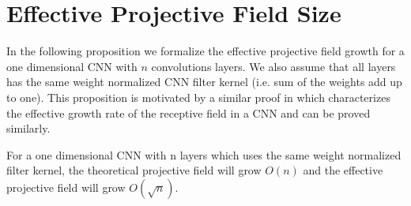 \section{Effective Projective Field Size}

In the following proposition we formalize the effective projective field growth for a one dimensional CNN with $n$ convolutions layers. We also assume that all layers has the same weight normalized CNN filter kernel (i.e. sum of the weights add up to one). 
This proposition is motivated by a similar proof in \cite{luo2016understanding} which characterizes the effective growth rate of the receptive field in a CNN and can be proved similarly.

\begin{prop}
For a one dimensional CNN with n layers which uses the same weight normalized filter kernel, the theoretical projective field will grow $O(n)$ and the effective projective field will grow $O(\sqrt{n})$.
\end{prop}




